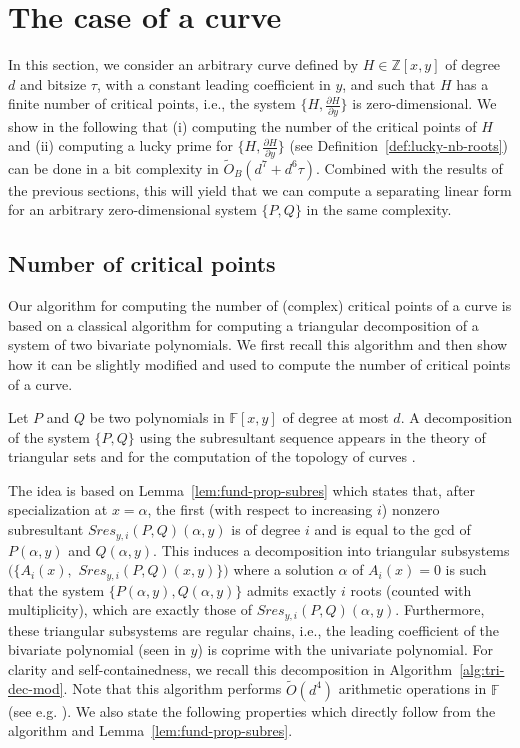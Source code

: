 \documentclass{sig-alternate}
\newcommand {\Z}   {\mathbb Z}
\newcommand{\sO}{\ensuremath{\widetilde{{O}}}}
\newcommand{\sOB}{\ensuremath{\widetilde{{O}}_B}}
\newcommand{\blue}[1]{\color{blue}#1\color{black}\xspace}
\renewcommand{\blue}[1]{#1\xspace}
\begin{document}
\section{The case of a curve}
\label{sec:curve}

In this section, we consider an arbitrary curve defined by  $H\in\Z[x,y]$ of degree $d$ and bitsize
$\tau$, with a constant leading
coefficient in $y$, and such that $H$ has a finite number of critical points, i.e., the system
$\{H,\frac{\partial H}{\partial y}\}$ is zero-dimensional. We show in the following that  (i) computing the number of the critical points of
$H$ and (ii) computing a lucky prime for $\{H,\frac{\partial H}{\partial
    y}\}$ (see Definition~\ref{def:lucky-nb-roots}) can be done in a bit complexity in $\sOB(d^7+d^6\tau)$. 
Combined with the results of the previous sections, this will yield that we can compute a separating
linear form for an arbitrary zero-dimensional system $\{P,Q\}$ in the same complexity.


\subsection{Number of critical points}\label{sec:nb-critical}

Our algorithm for computing  the number of (complex) critical points of a curve is based on  
a classical algorithm for computing a triangular decomposition of
a system of two bivariate polynomials. We first recall this algorithm and then show how it can be slightly modified and used to compute the number of critical points of a curve. 


\smallskip
{}\quad
Let $P$ and $Q$ be two polynomials in $\mathbb{F}[x,y]$ of degree at most $d$.
A decomposition  of the system $\{P,Q\}$ using the
subresultant sequence appears in the theory of triangular sets
\cite{Li-modpn-11} and for the computation of the topology of curves
\cite{VegKah:curve2d:96}. 


The idea is based on Lemma~\ref{lem:fund-prop-subres} which states that, after
specialization at $x=\alpha$, the first (with respect to increasing $i$) nonzero
subresultant $Sres_{y,i}(P,Q)(\alpha,y)$ is of degree $i$ and is equal to the
gcd of $P(\alpha,y)$ and $Q(\alpha,y)$.  This induces a decomposition 
into triangular subsystems $(\{A_i(x),$ $Sres_{y,i}(P,Q)(x,y)\})$ where a solution
$\alpha$ of $A_i(x)=0$ is such that the system $\{P(\alpha,y), Q(\alpha,y)\}$
admits exactly $i$ roots (counted with multiplicity), which are exactly those of
$Sres_{y,i}(P,Q)(\alpha,y)$.  Furthermore, these triangular subsystems are
regular chains, i.e., the leading coefficient of the bivariate polynomial (seen
in $y$) is coprime with the univariate polynomial.  For clarity and
self-containedness, we recall this decomposition in
Algorithm~\ref{alg:tri-dec-mod}. 
Note that this algorithm performs $\sO(d^4)$ arithmetic operations in $\mathbb{F}$ (see e.g. \blue{\cite[Lemma 15]{bouzidiJSC2014a}}).  We also state the following properties which directly follow from the algorithm and Lemma~\ref{lem:fund-prop-subres}.
\end{document}
